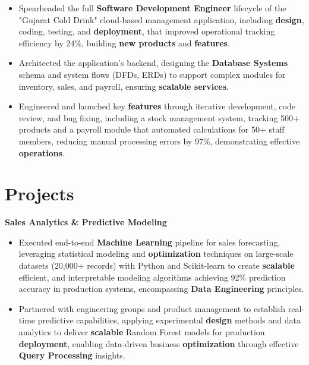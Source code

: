 \documentclass[a4paper,10pt]{article}
\begin{document}
\begin{itemize}[leftmargin=*, itemsep=0pt, parsep=1pt] %
\vspace{-7mm}
    \item Spearheaded the full \textbf{Software Development Engineer} lifecycle of the "Gujarat Cold Drink" cloud-based management application, including \textbf{design}, coding, testing, and \textbf{deployment}, that improved operational tracking efficiency by 24\%, building \textbf{new products} and \textbf{features}.
\item Architected the application's backend, designing the \textbf{Database Systems} schema and system flows (DFDs, ERDs) to support complex modules for inventory, sales, and payroll, ensuring \textbf{scalable services}.
\item Engineered and launched key \textbf{features} through iterative development, code review, and bug fixing, including a stock management system, tracking 500+ products and a payroll module that automated calculations for 50+ staff members, reducing manual processing errors by 97\%, demonstrating effective \textbf{operations}. 

\end{itemize}

\vspace{-4mm}

\section*{Projects}
\textbf{Sales Analytics \& Predictive Modeling} \\
\begin{itemize}[leftmargin=*, itemsep=0pt, parsep=1pt]
\vspace{-7mm}
    \item Executed end-to-end \textbf{Machine Learning} pipeline for sales forecasting, leveraging statistical modeling and \textbf{optimization} techniques on large-scale datasets (20,000+ records) with Python and Scikit-learn to create \textbf{scalable} efficient, and interpretable modeling algorithms achieving 92\% prediction accuracy in production systems, encompassing \textbf{Data Engineering} principles.
    \item Partnered with engineering groups and product management to establish real-time predictive capabilities, applying experimental \textbf{design} methods and data analytics to deliver \textbf{scalable} Random Forest models for production \textbf{deployment}, enabling data-driven business \textbf{optimization} through effective \textbf{Query Processing} insights.
    \end{itemize}
\end{document}
